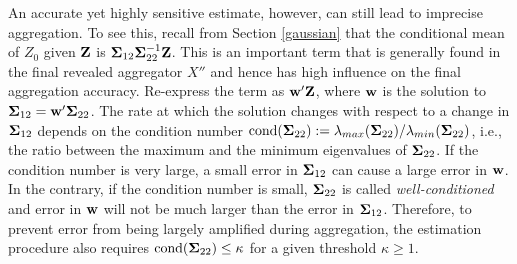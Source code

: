 \documentclass[11pt]{article}
\theoremstyle{definition}
\theoremstyle{definition}
\def\bSigma{{\bf \Sigma}}
\def\w{{\bf w}}
\def\Z{{\bf Z}}
\def\cond{\text{cond}}
\begin{document}
An accurate yet highly sensitive estimate, however, can still lead to imprecise aggregation. To see this, recall from Section \ref{gaussian} that the conditional mean of $Z_0$ given $\Z$ is  $\bSigma_{12} \bSigma_{22}^{-1} \Z$. This is an important term that is generally found in the final revealed aggregator $X''$ and hence has high influence on the final aggregation accuracy. 
 Re-express the term as $\w' \Z$, where $\w$ is the solution to $\bSigma_{12} = \w' \bSigma_{22}$. The rate at which the solution changes with respect to a change in $\bSigma_{12}$ depends on the condition number $\cond(\bSigma_{22}) := \lambda_{max}(\bSigma_{22}) / \lambda_{min}(\bSigma_{22})$, i.e., the ratio between the maximum and the minimum eigenvalues of $\bSigma_{22}$. If the condition number is very large, a small error in $\bSigma_{12}$ can cause a large error in $\w$. In the contrary, if the condition number is small, $\bSigma_{22}$ is called \textit{well-conditioned} and error in $\w$ will not be much larger than the error in $\bSigma_{12}$. Therefore, to prevent error from being largely amplified during aggregation, the estimation procedure also requires $\cond(\bSigma_{22}) \leq \kappa$ for a given threshold $\kappa \geq 1$. 
 
% 


\end{document}
